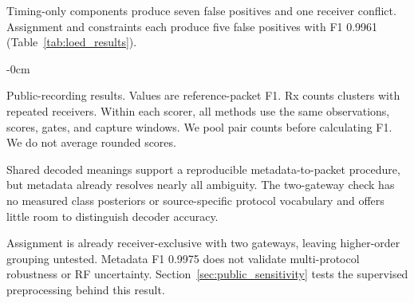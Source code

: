 Timing-only components produce seven false positives and one receiver conflict. Assignment and constraints each produce five false positives with F1 0.9961 (Table~\ref{tab:loed_results}).

\begin{table}[!t]\begin{adjustwidth}{-\extralength}{0cm}
\caption{Public-recording results. Values are reference-packet F1. Rx counts clusters with repeated receivers. Within each scorer, all methods use the same observations, scores, gates, and capture windows. We pool pair counts before calculating F1. We do not average rounded scores.}\label{tab:loed_results}
\small\renewcommand{\arraystretch}{1.12}
\end{adjustwidth}\end{table}

Shared decoded meanings support a reproducible metadata-to-packet procedure, but metadata already resolves nearly all ambiguity. The two-gateway check has no measured class posteriors or source-specific protocol vocabulary and offers little room to distinguish decoder accuracy.

Assignment is already receiver-exclusive with two gateways, leaving higher-order grouping untested. Metadata F1 0.9975 does not validate multi-protocol robustness or RF uncertainty. Section~\ref{sec:public_sensitivity} tests the supervised preprocessing behind this result.
